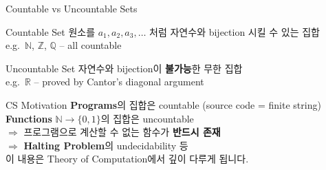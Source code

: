 \documentclass{beamer}
\begin{document}
\begin{frame}[t]{Countable vs Uncountable Sets}
    \small
    \vspace{0.1cm}
    \begin{block}{Countable Set}
        \footnotesize
        원소를 $a_1, a_2, a_3, \ldots$ 처럼 자연수와 bijection 시킬 수 있는 집합\\[4pt]
        e.g.\ $\mathbb{N}$, $\mathbb{Z}$, $\mathbb{Q}$ -- all countable
    \end{block}

    \vspace{0.1cm}
    \begin{alertblock}{Uncountable Set}
        \footnotesize
        자연수와 bijection이 \textbf{불가능}한 무한 집합\\[4pt]
        e.g.\ $\mathbb{R}$ -- proved by Cantor's diagonal argument
    \end{alertblock}

    \vspace{0.15cm}
    \begin{exampleblock}{CS Motivation}
        \footnotesize
        \textbf{Programs}의 집합은 countable (source code = finite string)\\
        \textbf{Functions} $\mathbb{N} \to \{0,1\}$의 집합은 uncountable\\[4pt]
        $\Rightarrow$ 프로그램으로 계산할 수 없는 함수가 \textbf{반드시 존재}\\
        $\Rightarrow$ \textbf{Halting Problem}의 undecidability 등\\[4pt]
        이 내용은 Theory of Computation에서 깊이 다루게 됩니다.
    \end{exampleblock}
\end{frame}

\end{document}
